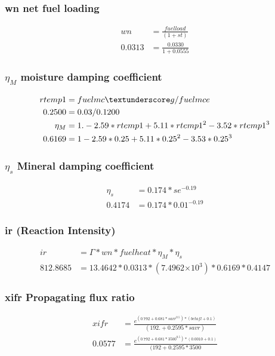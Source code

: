\documentclass{article}
\newcommand\tenpow[1]{\ensuremath{{\times}10^{#1}}}
\begin{document}
\subsubsection*{wn net fuel loading}

\begin{equation}
\label{wn_WRF}
	\begin{split}
	wn &= \frac{fuelload}{(1+ st)} \\
	0.0313 &= \frac{0.0330}{1 + 0.0555}
	\end{split}
\end{equation}

\subsubsection*{$\eta_M$ moisture damping coefficient}
\begin{equation}
	\begin{split}
		rtemp1 &= fuelmc\textunderscore g / fuelmce \\
		0.2500 &= 0.03 / 0.1200 \\
		\eta_M & = 1.-2.59*rtemp1 +5.11*rtemp1^2 -3.52*rtemp1^3 \\
		0.6169 &= 1 - 2.59 * 0.25 + 5.11 * 0.25^2 - 3.53 * 0.25^3
	\end{split}
\end{equation}

\subsubsection*{$\eta_s$ Mineral damping coefficient}
\begin{equation}
	\begin{split}
		\eta_s &= 0.174 * se^{-0.19} \\
		0.4174 &= 0.174 * 0.01 ^ {-0.19}
	\end{split}
\end{equation}

\subsubsection*{ir (Reaction Intensity)}
\begin{equation}
	\begin{split}
		ir       &= \Gamma * wn * fuelheat * \eta_M * \eta_s \\
		812.8685 &= 13.4642 * 0.0313 * (7.4962 \tenpow{3}) * 0.6169 * 0.4147
	\end{split}
\end{equation}
\subsubsection*{xifr Propagating flux ratio}
\begin{equation}
	\begin{split}
		xifr     &= \frac{e^ {(0.792 + 0.681*savr^0.5) * (betafl+0.1)}} {(192. + 0.2595*savr)} \\
		0.0577 &= \frac{e^{(0.792 + 0.681 * 3500^{0.5}) * (0.0010 + 0.1)}} {(192 + 0.2595 * 3500}
	\end{split}
\end{equation}
\end{document}
